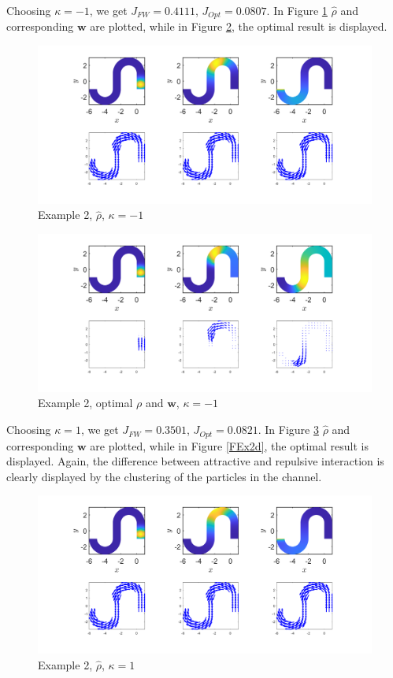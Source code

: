 \documentclass[11pt, a4paper]{article}
\theoremstyle{definition}
\newcommand{\w}{\mathbf{w}}
\begin{document}
Choosing $\kappa = -1$, we get $J_{FW} =  0.4111$, $J_{Opt} =  0.0807$. In Figure \ref{FEx2a} $\widehat \rho$ and corresponding $\w$ are plotted, while in Figure \ref{FEx2b}, the optimal result is displayed. 
\begin{figure}[h]
	\centering
	\includegraphics[scale=0.3]{FW2n1.png}
	\caption{Example 2, $\widehat \rho$, $\kappa = -1$} 
	\label{FEx2a}
\end{figure}
\begin{figure}[h]
	\centering
	\includegraphics[scale=0.3]{Opt2n1.png}
	\caption{Example 2, optimal $\rho$ and $\w$, $\kappa = -1$} 
	\label{FEx2b}
\end{figure}
Choosing $\kappa = 1$, we get $J_{FW} =  0.3501$, $J_{Opt} =  0.0821$. In Figure \ref{FEx2c} $\widehat \rho$ and corresponding $\w$ are plotted, while in Figure \ref{FEx2d}, the optimal result is displayed. Again, the difference between attractive and repulsive interaction is clearly displayed by the clustering of the particles in the channel.
\begin{figure}[h]
	\centering
	\includegraphics[scale=0.3]{FW21.png}
	\caption{Example 2, $\widehat \rho$, $\kappa = 1$} 
	\label{FEx2c}
\end{figure}
\end{document}
